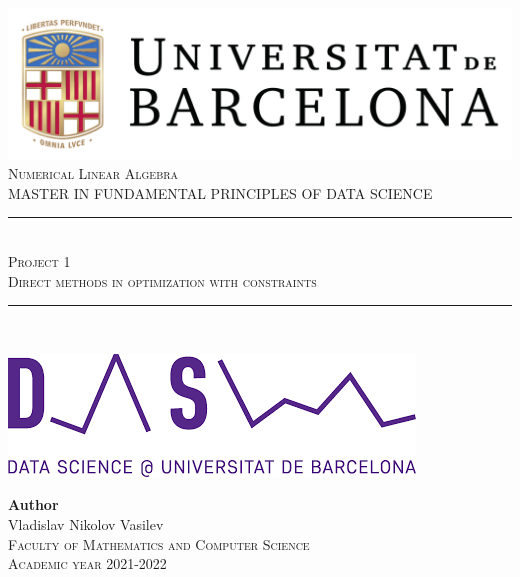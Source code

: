 \documentclass[11pt,a4paper]{article}
\newcommand{\subject}{Numerical Linear Algebra}
\newcommand{\autor}{Vladislav Nikolov Vasilev}
\newcommand{\titulo}{Project 1}
\newcommand{\subtitulo}{Direct methods in optimization with constraints}
\newcommand{\masters}{Master in Fundamental Principles of Data Science}
\begin{document}

\begin{titlepage}
  \begin{minipage}{\textwidth}
    \centering
    \includegraphics[scale=0.25]{img/ub-logo}\\[2cm]
    
    \textsc{\Large \subject\\[0.5cm]}
    \textsc{\uppercase\expandafter{\masters}}\\[1.5cm]
    
    \noindent\rule[-1ex]{\textwidth}{1pt}\\[1.5ex]
    \textsc{{\Huge \titulo\\[0.5ex]}}
    \textsc{{\Large \subtitulo\\}}
    \noindent\rule[-1ex]{\textwidth}{2pt}\\[3.5ex]
  \end{minipage}
  
  \vspace{2cm}
  
  \begin{minipage}{\textwidth}
    \centering
    
    \includegraphics[scale=0.4]{img/ub-ds-logo}
    \vspace{2cm}
    
    \textbf{Author}\\ {\autor{}}\\[2.5ex]
    \textsc{Faculty of Mathematics and Computer Science}\\
    \vspace{1em}
    \textsc{Academic year 2021-2022}
  \end{minipage}
\end{titlepage}
\end{document}
